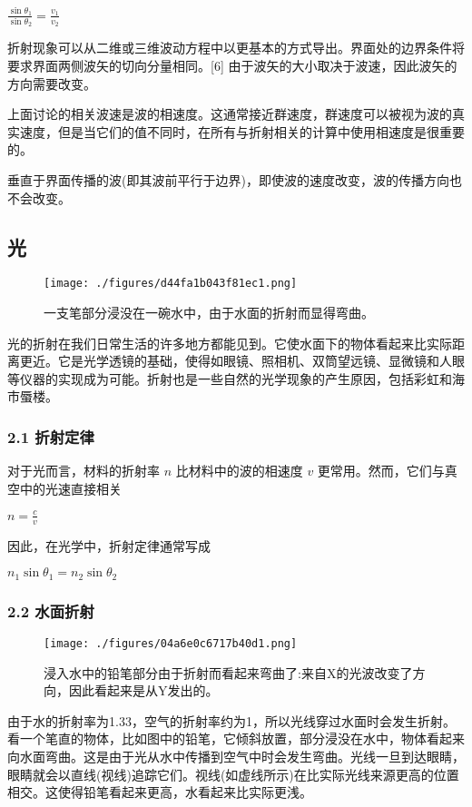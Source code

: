 $\frac{\sin \theta_1}{\sin \theta_2} = \frac{v_1}{v_2}  $

折射现象可以从二维或三维波动方程中以更基本的方式导出。界面处的边界条件将要求界面两侧波矢的切向分量相同。[6] 由于波矢的大小取决于波速，因此波矢的方向需要改变。

上面讨论的相关波速是波的相速度。这通常接近群速度，群速度可以被视为波的真实速度，但是当它们的值不同时，在所有与折射相关的计算中使用相速度是很重要的。

垂直于界面传播的波(即其波前平行于边界)，即使波的速度改变，波的传播方向也不会改变。

\subsection{光}

\begin{figure}[ht]
\centering
\texttt{[image: ./figures/d44fa1b043f81ec1.png]}
\caption{一支笔部分浸没在一碗水中，由于水面的折射而显得弯曲。} \label{fig_ZS_3}
\end{figure}

光的折射在我们日常生活的许多地方都能见到。它使水面下的物体看起来比实际距离更近。它是光学透镜的基础，使得如眼镜、照相机、双筒望远镜、显微镜和人眼等仪器的实现成为可能。折射也是一些自然的光学现象的产生原因，包括彩虹和海市蜃楼。

\subsubsection{2.1 折射定律}

对于光而言，材料的折射率 $n$ 比材料中的波的相速度 $v$ 更常用。然而，它们与真空中的光速直接相关

$n = \frac{c}{v}$

因此，在光学中，折射定律通常写成

$n_1 \sin \theta_1 = n_2 \sin \theta_2$

\subsubsection{2.2 水面折射}

\begin{figure}[ht]
\centering
\texttt{[image: ./figures/04a6e0c6717b40d1.png]}
\caption{浸入水中的铅笔部分由于折射而看起来弯曲了:来自X的光波改变了方向，因此看起来是从Y发出的。} \label{fig_ZS_4}
\end{figure}

由于水的折射率为1.33，空气的折射率约为1，所以光线穿过水面时会发生折射。看一个笔直的物体，比如图中的铅笔，它倾斜放置，部分浸没在水中，物体看起来向水面弯曲。这是由于光从水中传播到空气中时会发生弯曲。光线一旦到达眼睛，眼睛就会以直线(视线)追踪它们。视线(如虚线所示)在比实际光线来源更高的位置相交。这使得铅笔看起来更高，水看起来比实际更浅。


